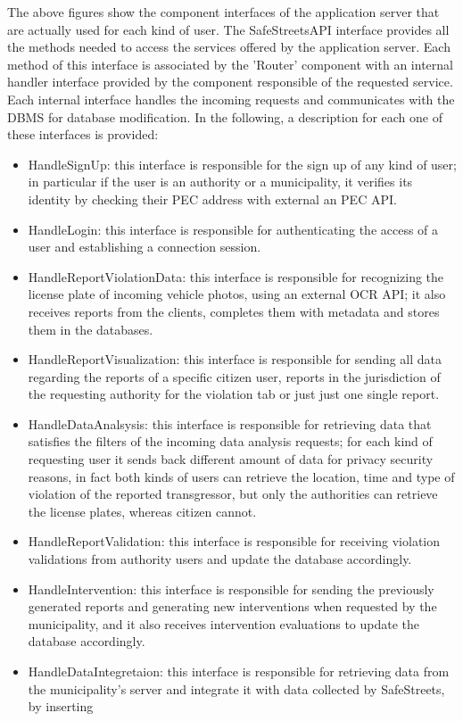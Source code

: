 The above figures show the component interfaces of the application server that are actually used for each kind of user. The SafeStreetsAPI interface provides all the methods needed to access the services offered by the application server. Each method of this interface is associated by the 'Router' component with an internal handler interface provided by the component responsible of the requested service. Each internal interface handles the incoming requests and communicates with the DBMS for database modification. In the following, a description for each one of these interfaces is provided:
\begin{itemize}
	\item HandleSignUp: this interface is responsible for the sign up of any kind of user; in particular if the user is an authority or a municipality, it verifies its identity by checking their PEC address with external an PEC API.
	\item HandleLogin: this interface is responsible for authenticating the access of a user and establishing a connection session.
	\item HandleReportViolationData: this interface is responsible for recognizing the license plate of incoming vehicle photos, using an external OCR API; it also receives reports from the clients, completes them with metadata and stores them in the databases.
	\item HandleReportVisualization: this interface is responsible for sending all data regarding the reports of a specific citizen user, reports in the jurisdiction of the requesting authority for the violation tab or just just one single report.
	\item HandleDataAnalsysis: this interface is responsible for retrieving data that satisfies the filters of the incoming data analysis requests; for each kind of requesting user it sends back different amount of data for privacy security reasons, in fact both kinds of users can retrieve the location, time and type of violation of the reported transgressor, but only the authorities can retrieve the license plates, whereas citizen cannot.
	\item HandleReportValidation: this interface is responsible for receiving violation validations from authority users and update the database accordingly.
	\item HandleIntervention: this interface is responsible for sending the previously generated reports and generating new interventions when requested by the municipality, and it also receives intervention evaluations to update the database accordingly.
	\item HandleDataIntegretaion: this interface is responsible for retrieving data from the municipality's server and integrate it with data collected by SafeStreets, by inserting 
\end{itemize}